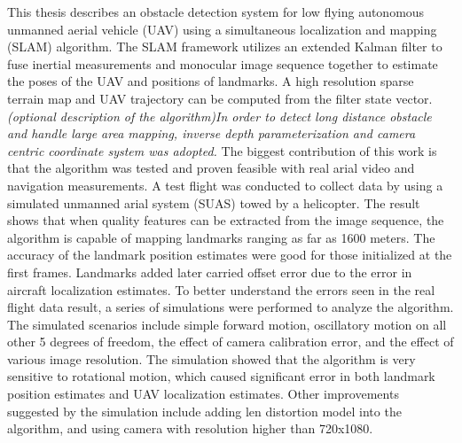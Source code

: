This thesis describes an obstacle detection system for low flying
autonomous unmanned aerial vehicle (UAV) using a simultaneous
localization and mapping (SLAM) algorithm.
The SLAM framework utilizes an extended Kalman filter to fuse inertial
measurements and monocular image sequence together to estimate the
poses of the UAV and positions of landmarks. A high resolution sparse
terrain map and UAV trajectory can be computed from the filter state
vector. 
\emph{(optional description of the algorithm)In order to
detect long distance obstacle and handle large area mapping, inverse
depth parameterization and camera centric coordinate system was
adopted.}
The biggest contribution of this work is that the algorithm was tested
and proven feasible with real arial video and navigation measurements.
A test flight was conducted to collect data by using a simulated
unmanned arial system (SUAS) towed by a helicopter. The result shows
that when quality features can be extracted from the image sequence,
the algorithm is capable of mapping landmarks ranging as far as 1600
meters. The accuracy of the landmark position estimates were good for
those initialized at the first frames. Landmarks added later carried
offset error due to the error in aircraft localization estimates.
To better understand the errors seen in the real flight data result, a
series of simulations were performed to analyze the algorithm. The
simulated scenarios include simple forward motion, oscillatory motion
on all other 5 degrees of freedom, the effect of camera calibration
error, and the effect of various image resolution. The simulation
showed that the algorithm is very sensitive to rotational motion,
which caused significant error in both landmark position estimates and
UAV localization estimates. Other improvements suggested by the
simulation include adding len distortion model into the algorithm, and
using camera with resolution higher than 720x1080.
